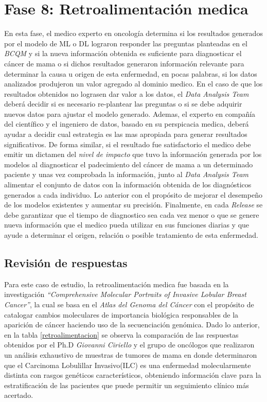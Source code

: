 \section{Fase 8: Retroalimentación medica }
En esta fase, el medico experto en oncología determina si los resultados generados por el modelo de ML o DL lograron responder las preguntas planteadas en el \textit{BCQM} y si la nueva información obtenida es suficiente para diagnosticar el cáncer de mama o si dichos resultados generaron información relevante para determinar la causa u origen de esta enfermedad, en pocas palabras, si los datos analizados produjeron un valor agregado al dominio medico. En el caso de que los resultados obtenidos no lograsen dar valor a los datos, el \textit{Data Analysis Team} deberá decidir si es necesario re-plantear las preguntas o si se debe adquirir nuevos datos para ajustar el modelo generado. Ademas, el experto en compañía del científico y el ingeniero de datos, basado en su perspicacia medica, deberá ayudar a decidir cual estrategia es las mas apropiada para generar resultados significativos. De forma similar, si el resultado fue satisfactorio el medico debe emitir un dictamen del \textit{nivel de impacto} que tuvo la información generada por los modelos al diagnosticar el padecimiento del cáncer de mama a un determinado paciente y unas vez comprobada la información, junto al \textit{Data Analysis Team} alimentar el conjunto de datos con la información obtenida de los diagnósticos generados a cada individuo. Lo anterior con el propósito de mejorar el desempeño de los modelos existentes y aumentar su precisión. Finalmente, en cada \textit{Release} se debe garantizar que el tiempo de diagnostico sea cada vez menor o que se genere nueva información que el medico pueda utilizar en sus funciones diarias y que ayude a determinar el origen, relación o posible tratamiento de esta enfermedad.

\subsection{Revisión de respuestas}
Para este caso de estudio, la retroalimentación medica fue basada en la investigación \textit{“Comprehensive Molecular Portraits of Invasive Lobular Breast Cancer”}\cite{Ciriello2015}, la cual se basa en el \textit {Atlas del Genoma del Cáncer} con el propósito de catalogar cambios moleculares de importancia biológica responsables de la aparición de cáncer haciendo uso de la secuenciación genómica. Dado lo anterior, en la tabla \ref{retroalimentacion} se observa la comparación de las respuestas obtenidos por el Ph.D \textit{Giovanni Ciriello} y el grupo de oncólogos que realizaron un análisis exhaustivo de muestras de tumores de mama en donde determinaron que el Carcinoma Lobulillar Invasivo(ILC) es una enfermedad molecularmente distinta con rasgos genéticos característicos, obteniendo información clave para la estratificación de las pacientes que puede permitir un seguimiento clínico más acertado.

